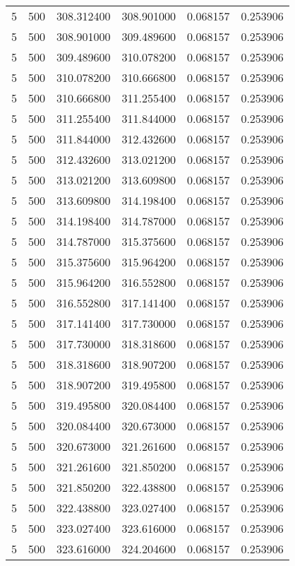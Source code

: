 \begin{longtable}{rrrrrr}
5 & 500 & 308.312400 & 308.901000 & 0.068157 & 0.253906 \\
5 & 500 & 308.901000 & 309.489600 & 0.068157 & 0.253906 \\
5 & 500 & 309.489600 & 310.078200 & 0.068157 & 0.253906 \\
5 & 500 & 310.078200 & 310.666800 & 0.068157 & 0.253906 \\
5 & 500 & 310.666800 & 311.255400 & 0.068157 & 0.253906 \\
5 & 500 & 311.255400 & 311.844000 & 0.068157 & 0.253906 \\
5 & 500 & 311.844000 & 312.432600 & 0.068157 & 0.253906 \\
5 & 500 & 312.432600 & 313.021200 & 0.068157 & 0.253906 \\
5 & 500 & 313.021200 & 313.609800 & 0.068157 & 0.253906 \\
5 & 500 & 313.609800 & 314.198400 & 0.068157 & 0.253906 \\
5 & 500 & 314.198400 & 314.787000 & 0.068157 & 0.253906 \\
5 & 500 & 314.787000 & 315.375600 & 0.068157 & 0.253906 \\
5 & 500 & 315.375600 & 315.964200 & 0.068157 & 0.253906 \\
5 & 500 & 315.964200 & 316.552800 & 0.068157 & 0.253906 \\
5 & 500 & 316.552800 & 317.141400 & 0.068157 & 0.253906 \\
5 & 500 & 317.141400 & 317.730000 & 0.068157 & 0.253906 \\
5 & 500 & 317.730000 & 318.318600 & 0.068157 & 0.253906 \\
5 & 500 & 318.318600 & 318.907200 & 0.068157 & 0.253906 \\
5 & 500 & 318.907200 & 319.495800 & 0.068157 & 0.253906 \\
5 & 500 & 319.495800 & 320.084400 & 0.068157 & 0.253906 \\
5 & 500 & 320.084400 & 320.673000 & 0.068157 & 0.253906 \\
5 & 500 & 320.673000 & 321.261600 & 0.068157 & 0.253906 \\
5 & 500 & 321.261600 & 321.850200 & 0.068157 & 0.253906 \\
5 & 500 & 321.850200 & 322.438800 & 0.068157 & 0.253906 \\
5 & 500 & 322.438800 & 323.027400 & 0.068157 & 0.253906 \\
5 & 500 & 323.027400 & 323.616000 & 0.068157 & 0.253906 \\
5 & 500 & 323.616000 & 324.204600 & 0.068157 & 0.253906 \\

\end{longtable}
